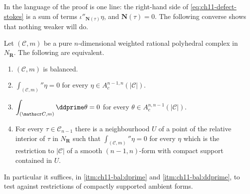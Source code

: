 In the language of  the proof is one line: the
right-hand side of \eqref{eq:ch11-defect-stokes} is a sum of terms
$\iota''_{\mathbf N(\tau)}\eta$, and $\mathbf N(\tau)=0$.  The following
converse shows that nothing weaker will do.

\begin{theorem}
\label{thm:ch11-balancing-iff-stokes}
Let $(\mathscr C,m)$ be a pure $n$-dimensional weighted rational polyhedral
complex in $N_{\mathbf R}$.  The following are equivalent.
\begin{enumerate}
\item\label{itm:ch11-bal:balanced}
  $(\mathscr C,m)$ is balanced.
\item\label{itm:ch11-bal:dprime}
  $\displaystyle\int_{(\mathscr C,m)}\dprime\eta=0$ for every
  $\eta\in A^{n-1,n}_c(|\mathscr C|)$.
\item\label{itm:ch11-bal:ddprime}
  $\displaystyle\int_{(\mathscr C,m)}\ddprime\theta=0$ for every
  $\theta\in A^{n,n-1}_c(|\mathscr C|)$.
\item\label{itm:ch11-bal:local}
  For every $\tau\in\mathscr C_{n-1}$ there is a neighbourhood $U$ of a
  point of the relative interior of $\tau$ in $N_{\mathbf R}$ such that
  $\int_{(\mathscr C,m)}\dprime\eta=0$ for every $\eta$ which is the
  restriction to $|\mathscr C|$ of a smooth $(n-1,n)$-form with compact
  support contained in $U$.
\end{enumerate}
In particular it suffices, in \cref{itm:ch11-bal:dprime} and
\cref{itm:ch11-bal:ddprime}, to test against restrictions of compactly
supported ambient forms.
\end{theorem}


